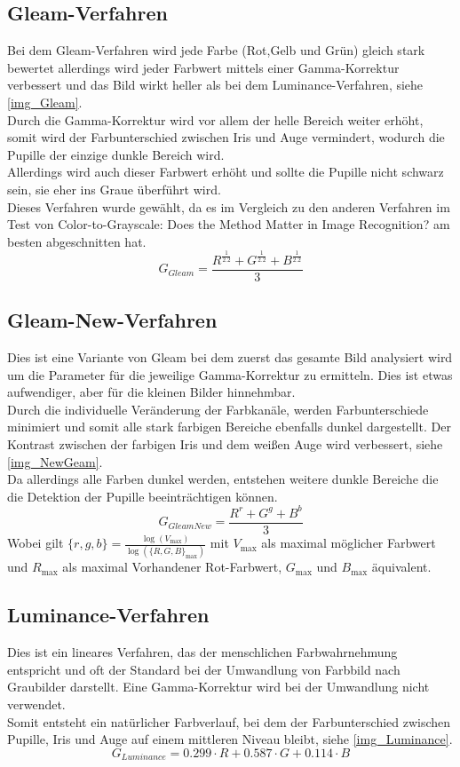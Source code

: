 \subsection{Gleam-Verfahren}
\label{gray_Gleam}
Bei dem Gleam-Verfahren wird jede Farbe (Rot,Gelb und Grün) gleich stark bewertet allerdings wird jeder Farbwert mittels einer Gamma-Korrektur verbessert und das Bild wirkt heller als bei dem Luminance-Verfahren, siehe \autoref{img_Gleam}.\\
Durch die Gamma-Korrektur wird vor allem der helle Bereich weiter erhöht, somit wird der Farbunterschied zwischen Iris und Auge vermindert, wodurch die Pupille der einzige dunkle Bereich wird.\\
Allerdings wird auch dieser Farbwert erhöht und sollte die Pupille nicht schwarz sein, sie eher ins Graue überführt wird.\\
Dieses Verfahren wurde gewählt, da es im Vergleich zu den anderen Verfahren im Test von \glqq Color-to-Grayscale: Does the Method Matter in Image Recognition?\grqq \cite{rgb_to_Gray} am besten abgeschnitten hat.
\[G_{Gleam}=\dfrac{R^{\frac{1}{2.2}} + G^{\frac{1}{2.2}} + B^{\frac{1}{2.2}}}{3}\]
\subsection{Gleam-New-Verfahren}
\label{gray_New}
Dies ist eine Variante von Gleam bei dem zuerst das gesamte Bild analysiert wird um die Parameter für die jeweilige Gamma-Korrektur zu ermitteln. Dies ist etwas aufwendiger, aber für die kleinen Bilder hinnehmbar.\\
Durch die individuelle Veränderung der Farbkanäle, werden Farbunterschiede minimiert und somit alle stark farbigen Bereiche ebenfalls dunkel dargestellt. Der Kontrast zwischen der farbigen Iris und dem weißen Auge wird verbessert, siehe \autoref{img_NewGeam}.\\
Da allerdings alle Farben dunkel werden, entstehen weitere dunkle Bereiche die die Detektion der Pupille beeinträchtigen können.
\[G_{Gleam New}=\dfrac{R^{r} + G^{g} + B^{b}}{3}\]
Wobei gilt $\{r,g,b\} = \frac{\log(V_{\max})}{\log(\{R,G,B\}_{\max})}$ mit $V_{\max}$ als maximal möglicher Farbwert und $R_{\max}$ als maximal Vorhandener Rot-Farbwert, $G_{\max}$ und $B_{\max}$ äquivalent.
\subsection{Luminance-Verfahren}
\label{gray_Luminance}
Dies ist ein lineares Verfahren, das der menschlichen Farbwahrnehmung entspricht und  oft der Standard bei der Umwandlung von Farbbild nach Graubilder darstellt. Eine Gamma-Korrektur wird bei der Umwandlung nicht verwendet.\\
Somit entsteht ein natürlicher Farbverlauf, bei dem der Farbunterschied zwischen Pupille, Iris und Auge auf einem mittleren Niveau bleibt, siehe \autoref{img_Luminance}.
\[G_{Luminance} = 0.299 \cdot R + 0.587 \cdot G + 0.114 \cdot B\]
